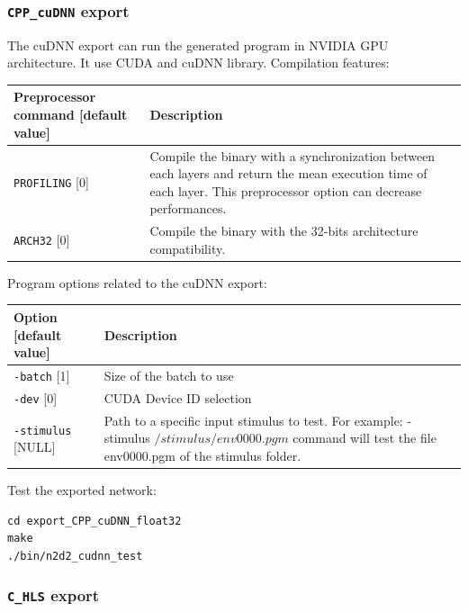 \documentclass[a4paper,11pt,oneside]{article}
\newcommand{\iponly}{\reversemarginpar
    \marginnote{\color{listletiblue}\normalfont\scriptsize
    {\ttfamily{}\hyperref[sec:N2D2-IP]{\color{listletiblue}N2D2 IP}} \emph{only}}}
\begin{document}
\subsubsection{\texorpdfstring{%
\lstinline[basicstyle=\ttfamily\bfseries]!CPP_cuDNN! export}{CPP\_cuDNN export}}
The cuDNN export can run the generated program in NVIDIA GPU architecture.
It use CUDA and cuDNN library.
Compilation features:
\begin{center}
 \begin{tabular}{| p{7cm} | p{8cm} | }
 \hline
 Preprocessor command [default value] & Description\\
 \hline\hline
  \lstinline!PROFILING! [0] & Compile the binary with a synchronization
  between each layers and return the mean execution time of each layer.
  This preprocessor option can decrease performances.\\
  \lstinline!ARCH32! [0] & Compile the binary with the 32-bits architecture
   compatibility.\\
 \hline
\end{tabular}
\end{center}

Program options related to the cuDNN export:
\begin{center}
 \begin{tabular}{| p{5cm} | p{10cm} | }
 \hline
 Option [default value] & Description\\
 \hline\hline
  \lstinline!-batch! [1] & Size of the batch to use \\
  \lstinline!-dev! [0] & CUDA Device ID selection  \\
  \lstinline!-stimulus! [NULL] & Path to a specific input stimulus to test.
  For example: -stimulus ${/stimulus/env0000.pgm}$ command will test the file
   env0000.pgm  of the stimulus folder.\\
 \hline
\end{tabular}
\end{center}

Test the exported network:
\begin{lstlisting}
cd export_CPP_cuDNN_float32
make
./bin/n2d2_cudnn_test
\end{lstlisting}

\subsubsection{\texorpdfstring{%
\lstinline[basicstyle=\ttfamily\bfseries]!C_HLS! export\protect\iponly}
{C\_HLS export}}
\end{document}
